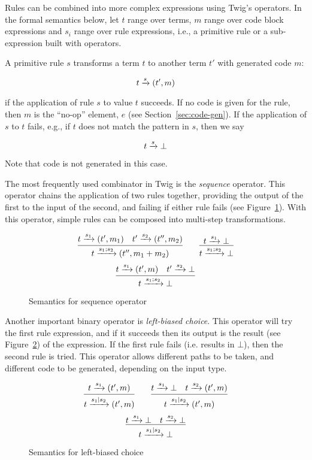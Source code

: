 Rules can be combined into more complex expressions using Twig's operators. In
the formal semantics below, let $t$ range over terms, $m$ range over code block
expressions and $s_i$ range over rule expressions, i.e., a primitive rule or a
sub-expression built with operators.

A primitive rule $s$ transforms a term $t$ to another term $t'$ with generated
code $m$:

\[
t \xrightarrow{s} (t',m)
\]

if the application of rule $s$ to value $t$ succeeds. If no code is given for
the rule, then $m$ is the ``no-op'' element, $e$ (see
Section~\ref{sec:code-gen}). If the application of $s$ to $t$ fails, e.g., if
$t$ does not match the pattern in $s$, then we say

\[
t \xrightarrow{s} \bot
\]

Note that code is not generated in this case.

The most frequently used combinator in Twig is the \emph{sequence} operator.
This operator chains the application of two rules together, providing the output
of the first to the input of the second, and failing if either rule fails (see
Figure~\ref{semantics:sequence}). With this operator, simple rules can be
composed into multi-step transformations.

\begin{figure}[ht]
\label{semantics:sequence}
\[
\infer{t \arr{s_1;s_2} (t'',m_1+m_2)}{t \arr{s_1} (t',m_1) \quad t' \arr{s_2} (t'',m_2)}
\qquad 
\infer{t \arr{s_1;s_2} \bot}{t \arr{s_1} \bot}
\]
\[
\infer{t \arr{s_1;s_2} \bot}{t \arr{s_1} (t',m) \quad t' \arr{s_2} \bot}
\]
\caption{Semantics for sequence operator}
\end{figure}

Another important binary operator is \emph{left-biased choice}. This operator
will try the first rule expression, and if it succeeds then its output is the
result (see Figure~\ref{semantics:choice}) of the expression. If the first rule
fails (i.e. results in $\bot$), then the second rule is tried. This operator
allows different paths to be taken, and different code to be generated,
depending on the input type.

\begin{figure}[ht]
\label{semantics:choice}
\[
\infer{t \arr{s_1|s_2} (t',m)}{t \arr{s_1} (t',m)}
\qquad 
\infer{t \arr{s_1|s_2} (t',m)}{t \arr{s_1} \bot \quad t \arr{s_2} (t',m)}
\]
\[
\infer{t \arr{s_1|s_2} \bot}{t \arr{s_1} \bot \quad t \arr{s_2} \bot}
\]
\caption{Semantics for left-biased choice}
\end{figure}

